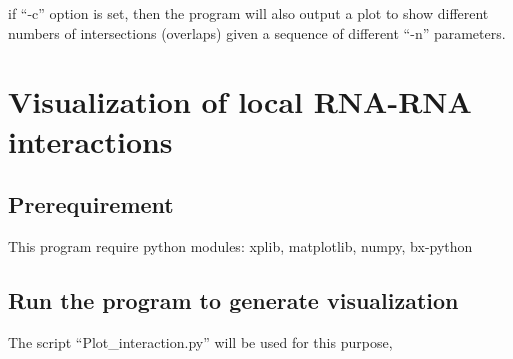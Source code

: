 \documentclass[letterpaper,10pt,english]{sphinxmanual}
\begin{document}
if ``-c'' option is set, then the program will also output a plot to show different numbers of intersections (overlaps) given a sequence of different ``-n'' parameters.


\chapter{Visualization of local RNA-RNA interactions}
\label{Visualization::doc}\label{Visualization:visualization-of-local-rna-rna-interactions}\label{Visualization:visualizationlocal}

\section{Prerequirement}
\label{Visualization:prerequirement}
This program require python modules: xplib, matplotlib, numpy, bx-python


\section{Run the program to generate visualization}
\label{Visualization:plotinteraction}\label{Visualization:run-the-program-to-generate-visualization}
The script ``Plot\_interaction.py'' will be used for this purpose,
\end{document}
